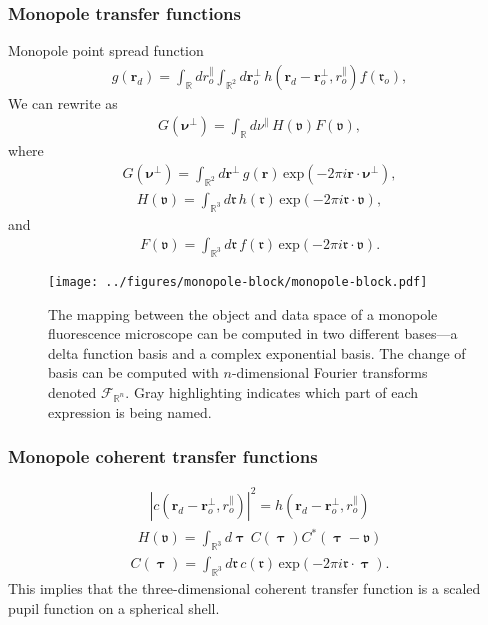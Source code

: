 \documentclass[]{osa-article}
\providecommand{\mb}[1]{\mathbf{#1}}
\providecommand{\mf}[1]{\mathfrak{#1}}
\providecommand{\ro}{\boldsymbol{\mathfrak{r}}_o}
\newcommand{\mypar}{\parallel}
\providecommand{\ropar}{r_o^{\mypar}}
\providecommand{\roperp}{\mathbf{r}_o^{\bot}}
\providecommand{\rd}{\mathbf{r}_d}
\providecommand{\mbb}[1]{\mathbb{#1}}
\providecommand{\bs}[1]{\boldsymbol{#1}}
\providecommand{\bv}{\boldsymbol{\mathfrak{v}}}
\providecommand{\bvperp}{\bs{\nu}^{\bot}}
\providecommand{\bvpar}{\nu^{\parallel}}
\providecommand{\bt}{\bs{\uptau}}
\begin{document}
\subsubsection{Monopole transfer functions}
Monopole point spread function
\begin{align}
  g(\rd) = \int_{\mbb{R}}d\ropar\int_{\mbb{R}^2}d\roperp\, h(\rd - \roperp, \ropar)f(\ro),
\end{align}
We can rewrite as 
\begin{align}
  G(\bvperp) = \int_{\mbb{R}}d\bvpar\, H(\bv)F(\bv),
\end{align}
where
\begin{align}
  G(\bvperp) = \int_{\mbb{R}^2}d\mb{r}^{\perp}\, g(\mb{r})\, \text{exp}(-2\pi i\mb{r}\cdot\bvperp),
\end{align}
\begin{align}
  H(\bv) = \int_{\mbb{R}^3}d\bs{\mf{r}}\, h(\bs{\mf{r}})\, \text{exp}(-2\pi i\bs{\mf{r}}\cdot\bv),
\end{align}
and
\begin{align}
  F(\bv) = \int_{\mbb{R}^3}d\bs{\mf{r}}\, f(\bs{\mf{r}})\, \text{exp}(-2\pi i\bs{\mf{r}}\cdot\bv).
\end{align}

\begin{figure}
  \centering
  \texttt{[image: ../figures/monopole-block/monopole-block.pdf]}
  \caption{
    The mapping between the object and data space of a monopole fluorescence microscope can be computed in two different bases---a delta function basis and a complex exponential basis. The change of basis can be computed with $n$-dimensional Fourier transforms denoted $\mathcal{F}_{\mbb{R}^n}$. Gray highlighting indicates which part of each expression is being named.
  }
  \label{fig:monopole-block}
\end{figure}

\subsubsection{Monopole coherent transfer functions}
\begin{align}
  |c(\rd - \roperp, \ropar)|^2 = h(\rd - \roperp, \ropar)
\end{align}
\begin{align}
  H(\bv) = \int_{\mbb{R}^3}d\bt\,C(\bt)C^*(\bt - \bv)
\end{align}
\begin{align}
  C(\bt) = \int_{\mbb{R}^3}d\bs{\mf{r}}\, c(\bs{\mf{r}})\,\text{exp}(-2\pi i\bs{\mf{r}}\cdot\bt).\label{eq:monoctf}
\end{align}
This implies that the three-dimensional coherent transfer function is a scaled pupil function on a spherical shell. 
\end{document}

